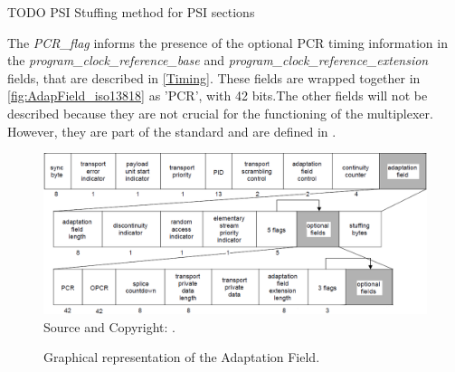 \documentclass[
	12pt,				%
	openright,			%
	twoside,			%
	a4paper,			%
	brazil,
	french,				%
	english
	]{abntex2}
\begin{document}
TODO PSI Stuffing method for PSI sections

The \textit{PCR\_flag} informs the presence of the optional PCR timing information in the \textit{program\_clock\_reference\_base} and \textit{program\_clock\_reference\_extension} fields, that are described in \autoref{Timing}. These fields are wrapped together in \autoref{fig:AdapField_iso13818} as 'PCR', with 42 bits.The other fields will not be described because they are not crucial for the functioning of the multiplexer. However, they are part of the standard and are defined in .

\begin{figure}
\centering
\caption{Graphical representation of the Adaptation Field.}
\includegraphics[width=1\linewidth]{figuras/AdapField_iso13818.png}
\\Source and Copyright: .
\label{fig:AdapField_iso13818}
\end{figure}


\end{document}
